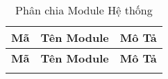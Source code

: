 \begin{longtable}{|m{1.5cm}|m{4.5cm}|m{9cm}|}
	\caption{Phân chia Module Hệ thống} \label{tab:modules}                                                                                                                                                                                                                                                                                                                                                                                                                                            \\
	\hline
	\textbf{Mã} & \textbf{Tên Module}                                     & \textbf{Mô Tả}                                                                                                                                                                                                                                                                                                                                                                                                             \\
	\hline
	\endfirsthead %

	\hline
	\textbf{Mã} & \textbf{Tên Module}                                     & \textbf{Mô Tả}                                                                                                                                                                                                                                                                                                                                                                                                             \\
	\hline
	\endhead %

	\hline
	\endfoot %

	\hline
	\endlastfoot %


\end{longtable}
